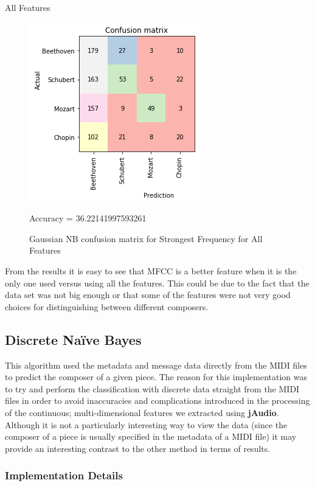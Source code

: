 \documentclass[11pt]{article}
\makeatletter
\def\maxwidth{\ifdim\Gin@nat@width>\linewidth\linewidth
    \else\Gin@nat@width\fi}
\let\Oldincludegraphics\includegraphics
\renewcommand{\includegraphics}[1]{\Oldincludegraphics[width=.8\maxwidth]{#1}}
\makeatother
\begin{document}
All Features

\begin{figure}[h!]
\includegraphics{report/plots/NB_All.png} \caption{Gaussian NB confusion matrix for Strongest Frequency for All Features}
Accuracy = 36.22141997593261
\end{figure}


From the results it is easy to see that MFCC is a better feature when it
is the only one used versus using all the features. This could be due to
the fact that the data set was not big enough or that some of the
features were not very good choices for distinguishing between different
composers.

    \subsection{Discrete Naïve Bayes}\label{discrete-nauxefve-bayes}

This algorithm used the metadata and message data directly from the MIDI
files to predict the composer of a given piece. The reason for this
implementation was to try and perform the classification with discrete
data straight from the MIDI files in order to avoid inaccuracies and
complications introduced in the processing of the continuous;
multi-dimensional features we extracted using \textbf{jAudio}. Although
it is not a particularly interesting way to view the data (since the
composer of a piece is usually specified in the metadata of a MIDI file)
it may provide an interesting contrast to the other method in terms of
results.

\subsubsection{Implementation Details}\label{implementation-details}
\end{document}
